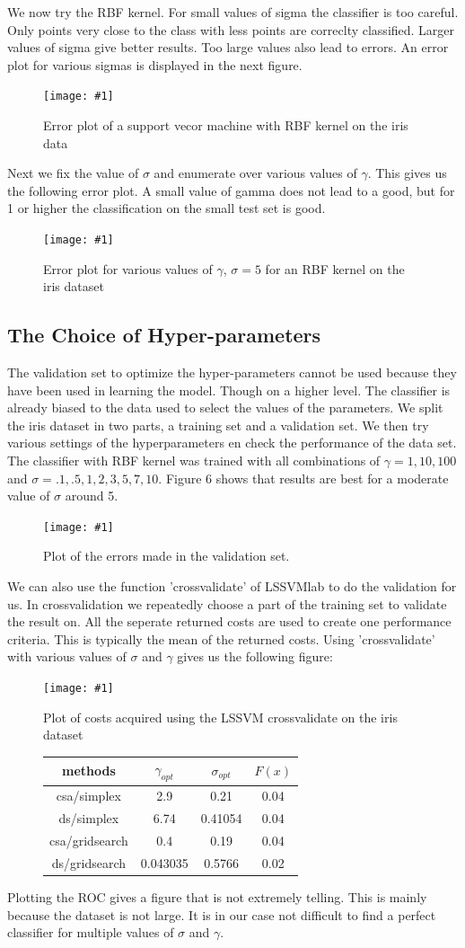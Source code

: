 \documentclass[•]{article}
\newcommand{\apicture}[2] {
  \begin{figure}[H]
  \centering
  \texttt{[image: \#1]}
  \caption{#2}
  \end{figure}
  }
\begin{document}
We now try the RBF kernel. For small values of sigma the classifier is too careful. Only points very close to the class with less points are correclty classified. Larger values of sigma give better results. Too large values also lead to errors. An error plot for various sigmas is displayed in the next figure.

\apicture{13errorplot.jpg}
{Error plot of a support vecor machine with RBF kernel on the iris data}

Next we fix the value of $\sigma$ and enumerate over various values of $\gamma$. This gives us the following error plot. A small value of gamma does not lead to a good, but for 1 or higher the classification on the small test set is good.

\apicture{13errplot2.jpg}{Error plot for various values of $\gamma$, $\sigma =5$ for an RBF kernel on the iris dataset}

\subsection{The Choice of Hyper-parameters}
The validation set to optimize the hyper-parameters cannot be used because they have been used in learning the model. Though on a higher level. The classifier is already biased to the data used to select the values of the parameters. We split the iris dataset in two parts, a training set and a validation set. We then try various settings of the hyperparameters en check the performance of the data set. The classifier with RBF kernel was trained with all combinations of $\gamma = 1,10,100$ and $\sigma=.1,.5,1,2,3,5,7,10$. Figure 6 shows that results are best for a moderate value of $\sigma$ around 5. 

\apicture{hypparerr.jpg}{Plot of the errors made in the validation set.}

We can also use the function 'crossvalidate' of LSSVMlab to do the validation for us. In crossvalidation we repeatedly choose a part of the training set to validate the result on. All the seperate returned costs are used to create one performance criteria. This is typically the mean of the returned costs. Using 'crossvalidate' with various values of $\sigma$ and $\gamma$ gives us the following figure:
\apicture{crossvalplot.jpg}{Plot of costs acquired using the LSSVM crossvalidate on the iris dataset}

\begin{figure}[H]
\centering
\begin{tabular}{|c|c|c|c|}
\hline
methods & $\gamma_{opt}$ & $\sigma_{opt}$ &$F(x) $ \\
\hline
csa/simplex & 2.9  & 0.21  & 0.04 \\
ds/simplex & 6.74  & 0.41054 & 0.04 \\
csa/gridsearch & 0.4  &  0.19 & 0.04\\
ds/gridsearch & 0.043035   &   0.5766 & 0.02\\
\hline
\end{tabular}
\end{figure}
Plotting the ROC gives a figure that is not extremely telling. This is mainly because the dataset is not large. It is in our case not difficult to find a perfect classifier for multiple values of $\sigma$ and $\gamma$.
\end{document}
